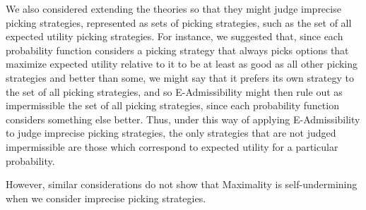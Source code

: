 \documentclass[a4paper,final]{article}
\newcommand\EU{\mathrm{EU}}
\newcommand{\todoold}[2][]{\todo[backgroundcolor=white,bordercolor=orange!10,linecolor=gray!10, #1,caption={},textcolor=gray]{Pre-rev: #2}}
\newcommand{\todooldinfo}[2][]{\todoold[#1]{#2}}
\newenvironment{CCM rewritten}
{\begingroup\color{blue}} %
{\endgroup}              %
\begin{document}
	We also considered extending the theories so that they might judge imprecise picking strategies, represented as sets of picking strategies, such as the set of all expected utility picking strategies. For instance, we suggested that, since each probability function considers a picking strategy that always picks options that maximize expected utility relative to it to be at least as good as all other picking strategies and better than some, we might say that it prefers its own strategy to the set of all picking strategies, and so E-Admissibility might then rule out as impermissible the set of all picking strategies, since each probability function considers something else better. Thus, under this way of applying E-Admissibility to judge imprecise picking strategies, the only strategies that are not judged impermissible are those which correspond to expected utility for a particular probability. \todooldinfo{ARGH!}

%
However, similar considerations do not show that Maximality is self-undermining when we consider imprecise picking strategies. 
\end{document}
